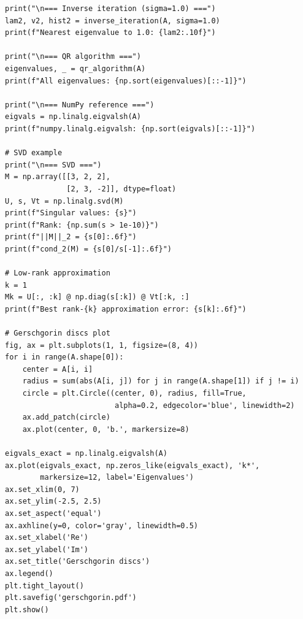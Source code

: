 \begin{codeblock}[title=\textbf{Python --- Eigenvalue algorithms}]
\begin{verbatim}
print("\n=== Inverse iteration (sigma=1.0) ===")
lam2, v2, hist2 = inverse_iteration(A, sigma=1.0)
print(f"Nearest eigenvalue to 1.0: {lam2:.10f}")

print("\n=== QR algorithm ===")
eigenvalues, _ = qr_algorithm(A)
print(f"All eigenvalues: {np.sort(eigenvalues)[::-1]}")

print("\n=== NumPy reference ===")
eigvals = np.linalg.eigvalsh(A)
print(f"numpy.linalg.eigvalsh: {np.sort(eigvals)[::-1]}")

# SVD example
print("\n=== SVD ===")
M = np.array([[3, 2, 2],
              [2, 3, -2]], dtype=float)
U, s, Vt = np.linalg.svd(M)
print(f"Singular values: {s}")
print(f"Rank: {np.sum(s > 1e-10)}")
print(f"||M||_2 = {s[0]:.6f}")
print(f"cond_2(M) = {s[0]/s[-1]:.6f}")

# Low-rank approximation
k = 1
Mk = U[:, :k] @ np.diag(s[:k]) @ Vt[:k, :]
print(f"Best rank-{k} approximation error: {s[k]:.6f}")

# Gerschgorin discs plot
fig, ax = plt.subplots(1, 1, figsize=(8, 4))
for i in range(A.shape[0]):
    center = A[i, i]
    radius = sum(abs(A[i, j]) for j in range(A.shape[1]) if j != i)
    circle = plt.Circle((center, 0), radius, fill=True,
                         alpha=0.2, edgecolor='blue', linewidth=2)
    ax.add_patch(circle)
    ax.plot(center, 0, 'b.', markersize=8)

eigvals_exact = np.linalg.eigvalsh(A)
ax.plot(eigvals_exact, np.zeros_like(eigvals_exact), 'k*',
        markersize=12, label='Eigenvalues')
ax.set_xlim(0, 7)
ax.set_ylim(-2.5, 2.5)
ax.set_aspect('equal')
ax.axhline(y=0, color='gray', linewidth=0.5)
ax.set_xlabel('Re')
ax.set_ylabel('Im')
ax.set_title('Gerschgorin discs')
ax.legend()
plt.tight_layout()
plt.savefig('gerschgorin.pdf')
plt.show()
\end{verbatim}
\end{codeblock}

